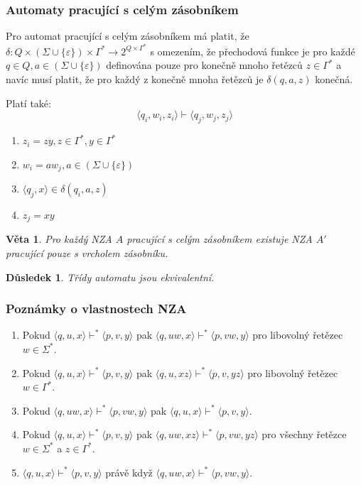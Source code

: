 \documentclass[10pt,a4paper]{article}
\theoremstyle{note}
\newtheorem{veta}{Věta}
\newtheorem{dusledek}{Důsledek}
\begin{document}
\subsubsection{Automaty pracující s celým zásobníkem}
Pro automat pracující s celým zásobníkem má platit, že $\delta : Q \times (\Sigma \cup \lbrace \varepsilon \rbrace) \times \Gamma^*
 \rightarrow 2^{Q \times \Gamma^*}$ s omezením, že přechodová funkce je pro každé $q \in Q, a \in (\Sigma \cup \lbrace \varepsilon \rbrace)$ definována
pouze pro konečně mnoho řetězců $z \in \Gamma^*$ a navíc musí platit, že pro každý z konečně mnoha řetězců je $\delta(q, a, z)$ konečná.

Platí také:
$$
\langle q_i, w_i, z_i \rangle \vdash \langle q_j, w_j, z_j \rangle
$$
\begin{enumerate}
\item
$z_i = zy, z \in \Gamma^*, y \in \Gamma^*$

\item
$w_i = aw_j, a \in (\Sigma \cup \lbrace \varepsilon \rbrace)$

\item
$\langle q_j, x \rangle \in \delta(q_i, a, z)$

\item
$z_j = xy$
\end{enumerate}

\begin{veta}
Pro každý NZA $A$ pracující s celým zásobníkem existuje NZA $A'$ pracující pouze s vrcholem zásobníku.
\end{veta}

\begin{dusledek}
Třídy automatu jsou ekvivalentní.
\end{dusledek}

\subsubsection{Poznámky o vlastnostech NZA}

\begin{enumerate}
\item 
Pokud $\langle q,u,x \rangle \vdash^* \langle p,v,y \rangle$ pak $\langle q,uw,x \rangle \vdash^* \langle p,vw,y \rangle$ pro libovolný řetězec $w \in \Sigma^*$.

\item
Pokud $\langle q,u,x \rangle \vdash^* \langle p,v,y \rangle$ pak $\langle q,u,xz \rangle \vdash^* \langle p,v,yz \rangle$ pro libovolný řetězec $w \in \Gamma^*$.

\item
Pokud $\langle q,uw,x \rangle \vdash^* \langle p,vw,y \rangle$ pak $\langle q,u,x \rangle \vdash^* \langle p,v,y \rangle$.

\item[1.+2.]
Pokud $\langle q,u,x \rangle \vdash^* \langle p,v,y \rangle$ pak $\langle q,uw,xz \rangle \vdash^* \langle p,vw,yz \rangle$ pro všechny řetězce $w \in \Sigma^* $ a $z \in \Gamma^*$.

\item[1.+3.]
$\langle q,u,x \rangle \vdash^* \langle p,v,y \rangle$ právě když $\langle q,uw,x \rangle \vdash^* \langle p,vw,y \rangle$.
\end{enumerate}
\end{document}
